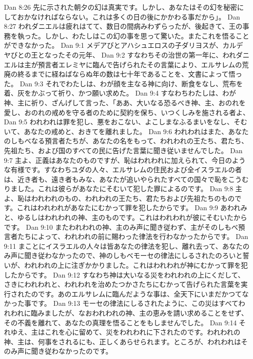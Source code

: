 Dan 8:26  先に示された朝夕の幻は真実です。しかし、あなたはその幻を秘密にしておかなければならない。これは多くの日の後にかかわる事だから」。
Dan 8:27  われダニエルは疲れはてて、数日の間病みわずらったが、後起きて、王の事務を執った。しかし、わたしはこの幻の事を思って驚いた。またこれを悟ることができなかった。
Dan 9:1  メデアびとアハシュエロスの子ダリヨスが、カルデヤびとの王となったその元年、
Dan 9:2  すなわちその治世の第一年に、われダニエルは主が預言者エレミヤに臨んで告げられたその言葉により、エルサレムの荒廃の終るまでに経ねばならぬ年の数は七十年であることを、文書によって悟った。
Dan 9:3  それでわたしは、わが顔を主なる神に向け、断食をなし、荒布を着、灰をかぶって祈り、かつ願い求めた。
Dan 9:4  すなわちわたしは、わが神、主に祈り、ざんげして言った、「ああ、大いなる恐るべき神、主、おのれを愛し、おのれの戒めを守る者のために契約を保ち、いつくしみを施される者よ、
Dan 9:5  われわれは罪を犯し、悪をおこない、よこしまなふるまいをなし、そむいて、あなたの戒めと、おきてを離れました。
Dan 9:6  われわれはまた、あなたのしもべなる預言者たちが、あなたの名をもって、われわれの王たち、君たち、先祖たち、および国のすべての民に告げた言葉に聞き従いませんでした。
Dan 9:7  主よ、正義はあなたのものですが、恥はわれわれに加えられて、今日のような有様です。すなわちユダの人々、エルサレムの住民および全イスラエルの者は、近き者も、遠き者もみな、あなたが追いやられたすべての国々で恥をこうむりました。これは彼らがあなたにそむいて犯した罪によるのです。
Dan 9:8  主よ、恥はわれわれのもの、われわれの王たち、君たちおよび先祖たちのものです。これはわれわれがあなたにむかって罪を犯したからです。
Dan 9:9  あわれみと、ゆるしはわれわれの神、主のものです。これはわれわれが彼にそむいたからです。
Dan 9:10  またわれわれの神、主のみ声に聞き従わず、主がそのしもべ預言者たちによって、われわれの前に賜わった律法を行わなかったからです。
Dan 9:11  まことにイスラエルの人々は皆あなたの律法を犯し、離れ去って、あなたのみ声に聞き従わなかったので、神のしもべモーセの律法にしるされたのろいと誓いが、われわれの上に注ぎかかりました。これはわれわれが神にむかって罪を犯したからです。
Dan 9:12  すなわち神は大いなる災をわれわれの上にくだして、さきにわれわれと、われわれを治めたつかさたちにむかって告げられた言葉を実行されたのです。あのエルサレムに臨んだような事は、全天下にいまだかつてなかった事です。
Dan 9:13  モーセの律法にしるされたように、この災はすべてわれわれに臨みましたが、なおわれわれの神、主の恵みを請い求めることをせず、その不義を離れて、あなたの真理を悟ることをもしませんでした。
Dan 9:14  それゆえ、主はこれを心に留めて、災をわれわれに下されたのです。われわれの神、主は、何事をされるにも、正しくあらせられます。ところが、われわれはそのみ声に聞き従わなかったのです。
